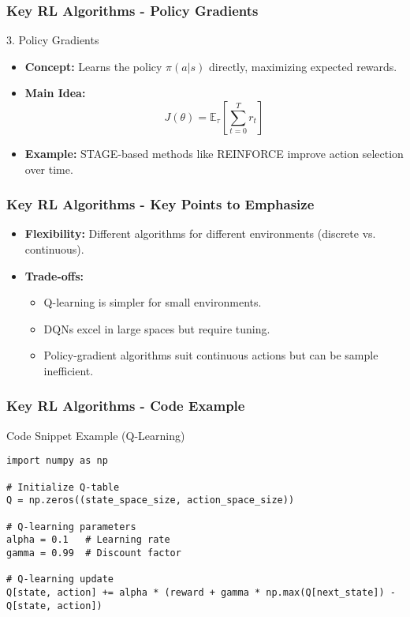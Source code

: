 \documentclass[aspectratio=169]{beamer}
\begin{document}
\begin{frame}[fragile]
    \frametitle{Key RL Algorithms - Policy Gradients}
    \begin{block}{3. Policy Gradients}
        \begin{itemize}
            \item \textbf{Concept:} Learns the policy \( \pi(a|s) \) directly, maximizing expected rewards.
            \item \textbf{Main Idea:} 
            \begin{equation}
                J(\theta) = \mathbb{E}_{\tau} \left[ \sum_{t=0}^{T} r_t \right]
            \end{equation}
            \item \textbf{Example:} STAGE-based methods like REINFORCE improve action selection over time.
        \end{itemize}
    \end{block}
\end{frame}

\begin{frame}[fragile]
    \frametitle{Key RL Algorithms - Key Points to Emphasize}
    \begin{itemize}
        \item \textbf{Flexibility:} Different algorithms for different environments (discrete vs. continuous).
        \item \textbf{Trade-offs:} 
        \begin{itemize}
            \item Q-learning is simpler for small environments.
            \item DQNs excel in large spaces but require tuning.
            \item Policy-gradient algorithms suit continuous actions but can be sample inefficient.
        \end{itemize}
    \end{itemize}
\end{frame}

\begin{frame}[fragile]
    \frametitle{Key RL Algorithms - Code Example}
    \begin{block}{Code Snippet Example (Q-Learning)}
    \begin{lstlisting}[style=mystyle]
import numpy as np

# Initialize Q-table
Q = np.zeros((state_space_size, action_space_size))

# Q-learning parameters
alpha = 0.1   # Learning rate
gamma = 0.99  # Discount factor

# Q-learning update
Q[state, action] += alpha * (reward + gamma * np.max(Q[next_state]) - Q[state, action])
    \end{lstlisting}
    \end{block}
\end{frame}
\end{document}
